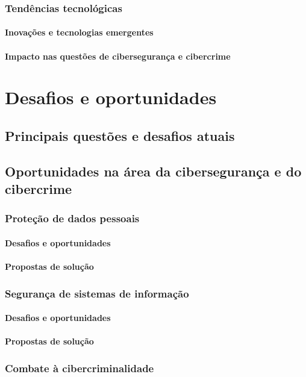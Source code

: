 \subsection{Tendências tecnológicas}
\subsubsection{Inovações e tecnologias emergentes}
\subsubsection{Impacto nas questões de cibersegurança e cibercrime}

\chapter{Desafios e oportunidades}
\section{Principais questões e desafios atuais}
\section{Oportunidades na área da cibersegurança e do cibercrime}
\subsection{Proteção de dados pessoais}
\subsubsection{Desafios e oportunidades}
\subsubsection{Propostas de solução}
\subsection{Segurança de sistemas de informação}
\subsubsection{Desafios e oportunidades}
\subsubsection{Propostas de solução}
\subsection{Combate à cibercriminalidade}

